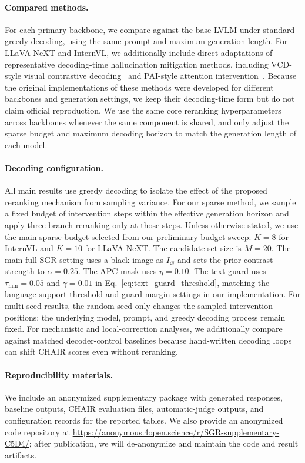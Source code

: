 \documentclass[11pt]{article}
\begin{document}
  \paragraph{Compared methods.}
  For each primary backbone, we compare against the base LVLM under standard greedy decoding, using the same prompt and maximum generation length.
  For LLaVA-NeXT and InternVL, we additionally include direct adaptations of representative decoding-time hallucination mitigation methods, including VCD-style visual contrastive decoding~\citep{Leng_2024_CVPR} and PAI-style attention
  intervention~\citep{liu2024payingattentionimagetrainingfree}.
  Because the original implementations of these methods were developed for different backbones and generation settings, we keep their decoding-time form but do not claim official reproduction.
  We use the same core reranking hyperparameters across backbones whenever the same component is shared, and only adjust the sparse budget and maximum decoding horizon to match the generation length of each model.

  \paragraph{Decoding configuration.}
  All main results use greedy decoding to isolate the effect of the proposed reranking mechanism from sampling variance.
  For our sparse method, we sample a fixed budget of intervention steps within the effective generation horizon and apply three-branch reranking only at those steps.
  Unless otherwise stated, we use the main sparse budget selected from our preliminary budget sweep: $K=8$ for InternVL and $K=10$ for LLaVA-NeXT.
  The candidate set size is $M=20$.
  The main full-SGR setting uses a black image as $I_{\varnothing}$ and sets the prior-contrast strength to $\alpha=0.25$.
  The APC mask uses $\eta=0.10$.
  The text guard uses $\tau_{\min}=0.05$ and $\gamma=0.01$ in Eq.~\ref{eq:text_guard_threshold}, matching the language-support threshold and guard-margin settings in our implementation.
  For multi-seed results, the random seed only changes the sampled intervention positions; the underlying model, prompt, and greedy decoding process remain fixed.
  For mechanistic and local-correction analyses, we additionally compare against matched decoder-control baselines because hand-written decoding loops can shift CHAIR scores even without reranking.

  \paragraph{Reproducibility materials.}
  We include an anonymized supplementary package with generated responses, baseline outputs, CHAIR evaluation files, automatic-judge outputs, and configuration records for the reported tables.
  We also provide an anonymized code repository at \url{https://anonymous.4open.science/r/SGR-supplementary-C5D4/}; after publication, we will de-anonymize and maintain the code and result artifacts.
\end{document}
